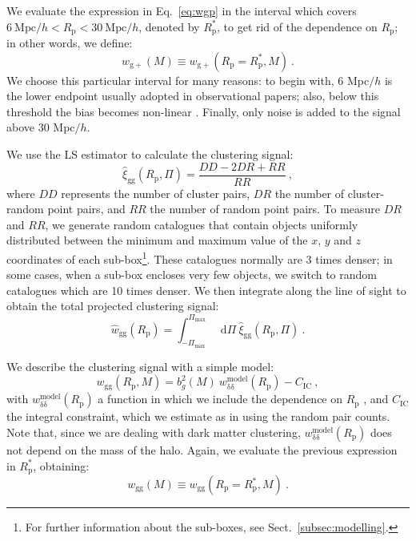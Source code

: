 \documentclass[a4paper,11pt]{article}
\newcommand*\dif{\mathop{}\!\mathrm{d}} 	%
\begin{document}
We evaluate the expression in Eq.~\ref{eq:wgp} in the interval which covers $6 \ \mbox{Mpc}/h < R_{\mathrm{p}} < 30 \ \mbox{Mpc}/h$, denoted by $R_{\mathrm{p}}^*$, to get rid of the dependence on $R_{\mathrm{p}}$; in other words, we define:
\begin{equation}
    w_{\mathrm{g+}} (M) \equiv w_{\mathrm{g+}} (R_{\mathrm{p}} = R_{\mathrm{p}}^*, M) \ .
	\label{eq:wgpmass}
\end{equation}
We choose this particular interval for many reasons: to begin with, $6$ Mpc$/h$ is the lower endpoint usually adopted in observational papers; also, below this threshold the bias becomes non-linear \cite{Joachimietal2013b}. Finally, only noise is added to the signal above $30$ Mpc$/h$.

We use the LS \cite{LandySzalay1993} estimator to calculate the clustering signal:
\begin{equation}
    \hat{\xi}_{\mathrm{gg}}(R_{\mathrm{p}}, \Pi) = \frac{DD -2DR + RR}{RR} \ ,
	\label{eq:xigghat}
\end{equation}
where $DD$ represents the number of cluster pairs, $DR$ the number of cluster-random point pairs, and $RR$ the number of random point pairs. To measure $DR$ and $RR$, we generate random catalogues that contain objects uniformly distributed between the minimum and maximum value of the $x$, $y$ and $z$ coordinates of each sub-box\footnote{For further information about the sub-boxes, see Sect.~\ref{subsec:modelling}.}. These catalogues normally are 3 times denser; in some cases, when a sub-box encloses very few objects, we switch to random catalogues which are 10 times denser. We then integrate along the line of sight to obtain the total projected clustering signal:
\begin{equation}
   \hat{w}_{\mathrm{gg}} (R_{\mathrm{p}}) = \int _{-\Pi_{\mathrm{max}}}^{\Pi_{\mathrm{max}}} \dif \Pi \ \hat{\xi}_{\mathrm{gg}}(R_{\mathrm{p}}, \Pi) \ .
	\label{eq:wgghat}
\end{equation}

We describe the clustering signal with a simple model:
\begin{equation}
    w_{\mathrm{gg}} (R_{\mathrm{p}}, M)=b_g^2 (M)\ w_{\mathrm{\delta} \mathrm{\delta}}^{\mathrm{model}} (R_{\mathrm{p}}) - C_{\mathrm{IC}} \ , 
	\label{eq:wgg}
\end{equation}
with $w_{\mathrm{\delta} \mathrm{\delta}}^{\mathrm{model}} (R_{\mathrm{p}})$ a function in which we include the dependence on $R_{\mathrm{p}}$ \cite[equation 9]{vanUitertJoachimi2017}, and $C_{\mathrm{IC}}$ the integral constraint, which we estimate as in \cite[equation 8]{RocheEales1999} using the random pair counts. Note that, since we are dealing with dark matter clustering, $w_{\mathrm{\delta} \mathrm{\delta}}^{\mathrm{model}} (R_{\mathrm{p}})$ does not depend on the mass of the halo. Again, we evaluate the previous expression in $R_{\mathrm{p}}^*$, obtaining:
\begin{equation}
    w_{\mathrm{gg}} (M) \equiv w_{\mathrm{gg}} (R_{\mathrm{p}} = R_{\mathrm{p}}^*, M) \ .
	\label{eq:wgpmass}
\end{equation}
\end{document}
